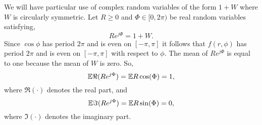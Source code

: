 \documentclass[draftcls, onecolumn, 11pt]{IEEEtran}
\begin{document}
We will have particular use of complex random variables of the form $1 + W$ where $W$ is circularly symmetric.  Let $R \geq 0$ and $\Phi \in [0,2\pi)$ be real random variables satisfying, 
\[
R e^{j\Phi} = 1 + W.
\]
Since $\cos\phi$ has period $2\pi$ and is even on $[-\pi,\pi]$ it follows that $f(r,\phi)$ has period $2\pi$ and is even on $[-\pi,\pi]$ with respect to $\phi$.  The mean of $R e^{j\Phi}$ is equal to one because the mean of $W$ is zero.  So,
\[
{\mathbb E} \Re(R e^{j\Phi}) = {\mathbb E} R \cos(\Phi) = 1,
\]
where $\Re(\cdot)$ denotes the real part, and
\begin{equation}\label{eq:expectImpartRphi}
{\mathbb E} \Im(R e^{j\Phi}) = {\mathbb E} R \sin(\Phi) = 0,
\end{equation}
where $\Im(\cdot)$ denotes the imaginary part.


\end{document}
